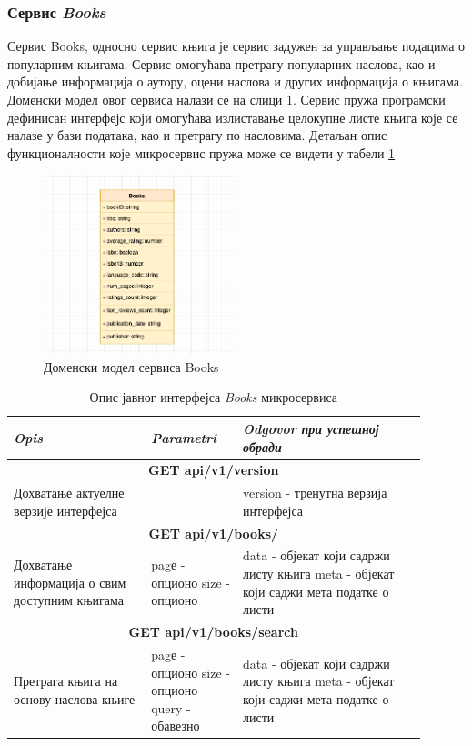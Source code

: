 \documentclass[12pt,oneside]{memoir}
\begin{document}
\subsubsection{Сервис \textit{Books}}

Сервис Books, односно сервис књига је сервис задужен за управљање подацима о популарним књигама. Сервис омогућава претрагу популарних наслова, као и добијање информација о аутору, оцени наслова и других информација о књигама. Доменски модел овог сервиса налази се на слици \ref{fig:booksShema}. 
Сервис пружа програмски дефинисан интерфејс који омогућава излиставање целокупне листе књига које се налазе у бази података, као и претрагу по насловима. Детаљан опис функционалности које микросервис пружа може се видети у табели \ref{tbl:booksAPI}


\begin{figure}[!ht]
  \centering
  \includegraphics[width=0.5\textwidth]{matfmaster/img/booksShema.png}
  \caption{Доменски модел сервиса Books}
  \label{fig:booksShema}
\end{figure}
\begin{table}
\caption{Опис јавног интерфејса \textit{Books} микросервиса}
\label{tbl:booksAPI}
\begin{tabular}{ |  p{0.3\linewidth} | p{0.2\linewidth}|  p{0.4\linewidth} | }
\hline
\textit{Opis} & \textit{Parametri} & \textit{Odgovor при успешној обради} \\
\hline
\multicolumn{3}{|c|}{\textbf{GET api/v1/version}} \\
\hline
Дохватање актуелне верзије интерфејса & & 
version - тренутна верзија интерфејса \\
\hline
\multicolumn{3}{|c|}{\textbf{GET api/v1/books/}} \\
\hline
Дохватање информација о свим доступним књигама & 
pagе - опционо \newline 
size - опционо & 
data - објекат који садржи листу књига \newline
meta - објекат који саджи мета податке о листи \\
\hline
\multicolumn{3}{|c|}{\textbf{GET api/v1/books/search}} \\
\hline
Претрага књига на основу наслова књиге &
pagе - опционо \newline
size - опционо \newline
query - обавезно & 
data - објекат који садржи листу књига \newline
meta - објекат који саджи мета податке о листи \\
\hline
\end{tabular}
\end{table}
\end{document}
